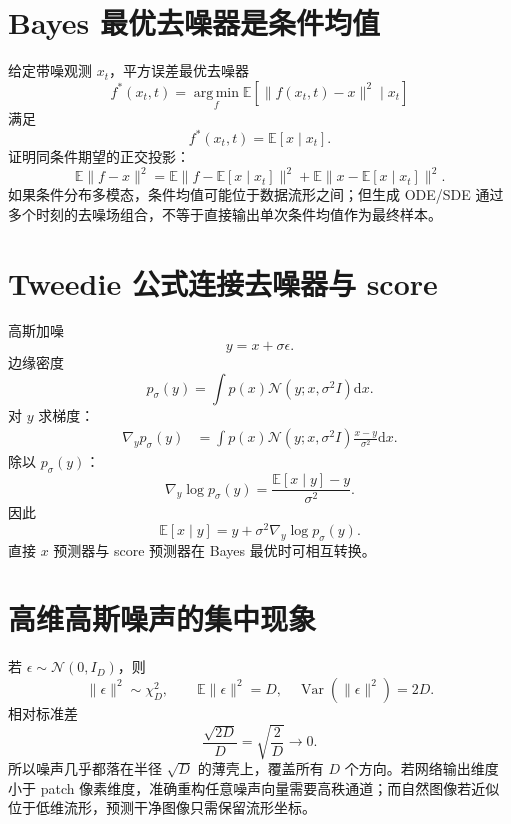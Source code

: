 \documentclass[UTF8,12pt,a4paper,fontset=none]{ctexart}
\numberwithin{equation}{section}
\newcommand{\E}{\mathbb{E}}
\newcommand{\argmin}{\operatorname*{arg\,min}}
\newcommand{\dd}{\mathrm{d}}
\begin{document}
\section{Bayes 最优去噪器是条件均值}
给定带噪观测 $x_t$，平方误差最优去噪器
\begin{equation}
 f^*(x_t,t)=\argmin_f
 \E[\|f(x_t,t)-x\|^2\mid x_t]
\end{equation}
满足
\begin{equation}
 \boxed{f^*(x_t,t)=\E[x\mid x_t].}
\end{equation}
证明同条件期望的正交投影：
\begin{equation}
 \E\|f-x\|^2
 =\E\|f-\E[x\mid x_t]\|^2+
 \E\|x-\E[x\mid x_t]\|^2.
\end{equation}
如果条件分布多模态，条件均值可能位于数据流形之间；但生成 ODE/SDE 通过多个时刻的去噪场组合，不等于直接输出单次条件均值作为最终样本。

\section{Tweedie 公式连接去噪器与 score}
高斯加噪
\begin{equation}
 y=x+\sigma\epsilon.
\end{equation}
边缘密度
\begin{equation}
 p_\sigma(y)=\int p(x)\mathcal N(y;x,\sigma^2I)\dd x.
\end{equation}
对 $y$ 求梯度：
\begin{align}
 \nabla_y p_\sigma(y)
 &=\int p(x)\mathcal N(y;x,\sigma^2I)
 \frac{x-y}{\sigma^2}\dd x.
\end{align}
除以 $p_\sigma(y)$：
\begin{equation}
 \nabla_y\log p_\sigma(y)
 =\frac{\E[x\mid y]-y}{\sigma^2}.
\end{equation}
因此
\begin{equation}
 \boxed{\E[x\mid y]=y+\sigma^2\nabla_y\log p_\sigma(y).}
\end{equation}
直接 $x$ 预测器与 score 预测器在 Bayes 最优时可相互转换。

\section{高维高斯噪声的集中现象}
若 $\epsilon\sim\mathcal N(0,I_D)$，则
\begin{equation}
 \|\epsilon\|^2\sim\chi_D^2,
 \qquad
 \E\|\epsilon\|^2=D,
 \quad
 \operatorname{Var}(\|\epsilon\|^2)=2D.
\end{equation}
相对标准差
\begin{equation}
 \frac{\sqrt{2D}}{D}=\sqrt{\frac2D}\to0.
\end{equation}
所以噪声几乎都落在半径 $\sqrt D$ 的薄壳上，覆盖所有 $D$ 个方向。若网络输出维度小于 patch 像素维度，准确重构任意噪声向量需要高秩通道；而自然图像若近似位于低维流形，预测干净图像只需保留流形坐标。
\end{document}
